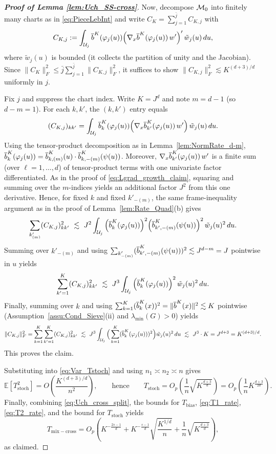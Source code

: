 \documentclass[12pt,american]{article}
\DeclareMathOperator{\tr}{tr}
\theoremstyle{definition}
\theoremstyle{plain}
\theoremstyle{definition}
\theoremstyle{plain}
\theoremstyle{plain}
\theoremstyle{plain}
\theoremstyle{plain}
\theoremstyle{plain}
\newcommand{\E}{\mathbb{E}}
\begin{document}
\begin{proof}[\textbf{Proof of Lemma \ref{lem:Uch_SS-cross}}]
\smallskip
Now, decompose $\mathcal{M}_0$ into finitely many charts as in \eqref{eq:PieceLebInt} and write $C_K=\sum_{j=1}^{\bar j} C_{K,j}$ with
\[
C_{K,j}:=\int_{\mathcal U_j}\overline{b}^K(\varphi_j(u))\Big(\nabla_x \overline{b}^K(\varphi_j(u))\,w'\Big)'\,\tilde w_j(u)\,du,
\]
where $\tilde w_j(u)$ is bounded (it collects the partition of unity and the Jacobian).
Since $\|C_K\|_F^2\le \bar j\sum_{j=1}^{\bar j}\|C_{K,j}\|_F^2$, it suffices to show $\|C_{K,j}\|_F^2\lesssim K^{(d+3)/d}$ uniformly in $j$.

Fix $j$ and suppress the chart index.
Write $K=J^d$ and note $m=d-1$ (so $d-m=1$).
For each $k,k'$, the $(k,k')$ entry equals
\[
(C_{K,j})_{kk'}
=\int_{\mathcal U_j}\overline{b}_k^K(\varphi_j(u))\Big(\nabla_x \overline{b}_{k'}^K(\varphi_j(u))\,w'\Big)\,\tilde w_j(u)\,du.
\]
Using the tensor-product decomposition as in Lemma~\ref{lem:NormRate_d-m},
$\overline{b}_{k}^K(\varphi_j(u))=\overline{b}_{k,(m)}^K(u)\cdot\overline{b}_{k,-(m)}^K(\psi(u))$.
Moreover, $\nabla_x \overline{b}_{k'}^K(\varphi_j(u))\,w'$ is a finite sum (over $\ell=1,\dots,d$) of tensor-product terms with one univariate factor differentiated.
As in the proof of \eqref{eq:Lgrad_growth_claim}, squaring and summing over the $m$-indices yields an additional factor $J^2$ from this one derivative.
Hence, for fixed $k$ and fixed $k'_{-(m)}$, the same frame-inequality argument as in the proof of Lemma~\ref{lem:Rate_Quad}(b) gives
\[
\sum_{k'_{(m)}} (C_{K,j})_{kk'}^2
\ \lesssim\ J^2\int_{\mathcal U_j}\Big(\overline{b}_k^K(\varphi_j(u))\Big)^2\Big(\overline{b}_{k',-(m)}^K(\psi(u))\Big)^2\,\tilde w_j(u)^2\,du.
\]
Summing over $k'_{-(m)}$ and using $\sum_{k'_{-(m)}}(\overline{b}_{k',-(m)}^K(\psi(u)))^2\lesssim J^{d-m}=J$ pointwise in $u$ yields
\[
\sum_{k'=1}^{K} (C_{K,j})_{kk'}^2
\ \lesssim\ J^3\int_{\mathcal U_j}\Big(\overline{b}_k^K(\varphi_j(u))\Big)^2\,\tilde w_j(u)^2\,du.
\]
Finally, summing over $k$ and using $\sum_{k=1}^{K}(\overline{b}_k^K(x))^2=\|\overline{b}^K(x)\|^2\lesssim K$ pointwise (Assumption~\ref{assu:Cond_Sieve}(ii) and $\lambda_{\min}(G)>0$) yields
\[
\|C_{K,j}\|_F^2
=\sum_{k=1}^{K}\sum_{k'=1}^{K}(C_{K,j})_{kk'}^2
\ \lesssim\ J^3\int_{\mathcal U_j}\Big(\sum_{k=1}^{K}(\overline{b}_k^K(\varphi_j(u)))^2\Big)\tilde w_j(u)^2\,du
\ \lesssim\ J^3\cdot K
=J^{d+3}
=K^{(d+3)/d}.
\]
This proves the claim.

Substituting into \eqref{eq:Var_Tstoch} and using $n_1\asymp n_2\asymp n$ gives
\[
\E[T_{\mathrm{stoch}}^2]=O\!\left(\frac{K^{(d+3)/d}}{n^2}\right),
\qquad\text{hence}\qquad
T_{\mathrm{stoch}}=O_p\!\left(\frac1n\sqrt{K^{\frac{d+3}{d}}}\right)
=O_p\!\left(\frac1n K^{\frac{d+3}{2d}}\right).
\]
Finally, combining \eqref{eq:Uch_cross_split}, the bounds for $T_{\mathrm{bias}}$, \eqref{eq:T1_rate}, \eqref{eq:T2_rate}, and the bound for $T_{\mathrm{stoch}}$ yields
\[
T_{\mathrm{mix-cross}}
=O_p\!\left(
K^{-\frac{2s-1}{d}}
+
K^{-\frac{s-1}{d}}\sqrt{\frac{K^{1/d}}{n}}
+
\frac1n\sqrt{K^{\frac{d+3}{d}}}
\right),
\]
as claimed.
\end{proof}
\end{document}
